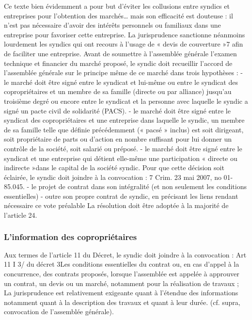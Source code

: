 			Ce texte bien évidemment a pour but d’éviter les collusions entre syndics et entreprises pour l’obtention des marchés… mais son efficacité est douteuse : il n’est pas nécessaire d’avoir des intérêts personnels ou familiaux dans une entreprise pour favoriser cette entreprise. La jurisprudence sanctionne néanmoins lourdement les syndics qui ont recours à l’usage de « devis de couverture »7 afin de faciliter une entreprise.
			Avant de soumettre à l'assemblée générale l’examen technique et financier du marché proposé, le syndic doit recueillir l’accord de l’assemblée générale sur le principe même de ce marché dans trois hypothèses :
			- le marché doit être signé entre le syndicat et lui-même ou entre le syndicat des copropriétaires et un membre de sa famille (directe ou par alliance) jusqu’au troisième degré ou encore entre le syndicat et la personne avec laquelle le syndic a signé un pacte civil de solidarité (PACS).
			- le marché doit être signé entre le syndicat des copropriétaires et une entreprise dans laquelle le syndic, un membre de sa famille telle que définie précédemment (« pacsé » inclus) est soit dirigeant, soit propriétaire de parts ou d’action en nombre suffisant pour lui donner un contrôle de la société, soit salarié ou préposé.
			- le marché doit être signé entre le syndicat et une entreprise qui détient elle-même une participation « directe ou indirecte »dans le capital de la société syndic.
			Pour que cette décision soit éclairée, le syndic doit joindre à la convocation :
			7 Crim. 23 mai 2007, no 01-85.045.
			- le projet de contrat dans son intégralité (et non seulement les conditions essentielles)
			- outre son propre contrat de syndic, en précisant les liens rendant nécessaire ce vote préalable
			La résolution doit être adoptée à la majorité de l’article 24.
			
		\subsubsection{L’information des copropriétaires}
		
			Aux termes de l’article 11 du Décret, le syndic doit joindre à la convocation :
			Art 11 I 3\degres/ du décret
			3\degres Les conditions essentielles du contrat ou, en cas d’appel à la concurrence, des contrats proposés, lorsque l’assemblée est appelée à approuver un contrat, un devis ou un marché, notamment pour la réalisation de travaux ;
			La jurisprudence est relativement exigeante quant à l’étendue des informations notamment quant à la description des travaux et quant à leur durée. (cf. supra, convocation de l’assemblée générale).
			
